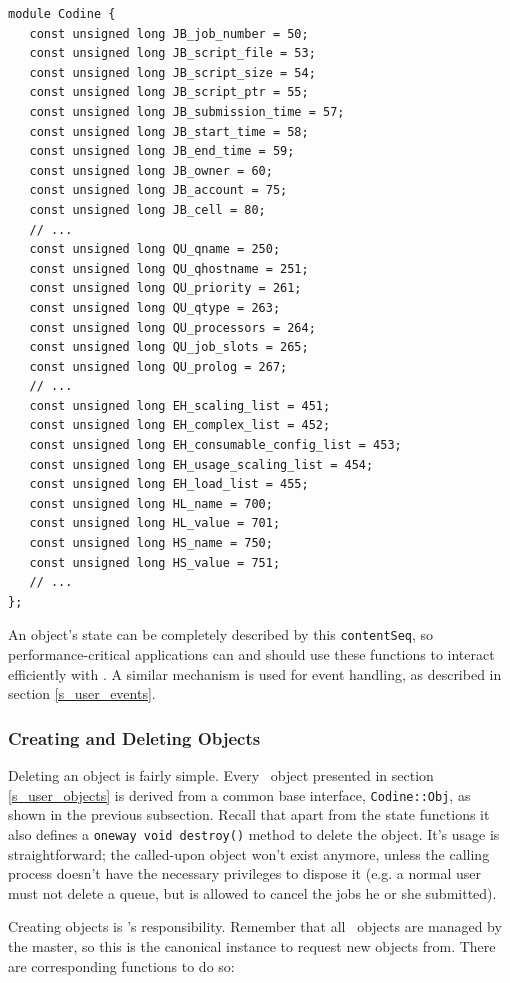 \begin{Verbatim}[fontsize=\small, frame=single]
module Codine {
   const unsigned long JB_job_number = 50;
   const unsigned long JB_script_file = 53;
   const unsigned long JB_script_size = 54;
   const unsigned long JB_script_ptr = 55;
   const unsigned long JB_submission_time = 57;
   const unsigned long JB_start_time = 58;
   const unsigned long JB_end_time = 59;
   const unsigned long JB_owner = 60;
   const unsigned long JB_account = 75;
   const unsigned long JB_cell = 80;
   // ...
   const unsigned long QU_qname = 250;
   const unsigned long QU_qhostname = 251;
   const unsigned long QU_priority = 261;
   const unsigned long QU_qtype = 263;
   const unsigned long QU_processors = 264;
   const unsigned long QU_job_slots = 265;
   const unsigned long QU_prolog = 267;
   // ...
   const unsigned long EH_scaling_list = 451;
   const unsigned long EH_complex_list = 452;
   const unsigned long EH_consumable_config_list = 453;
   const unsigned long EH_usage_scaling_list = 454;
   const unsigned long EH_load_list = 455;
   const unsigned long HL_name = 700;
   const unsigned long HL_value = 701;
   const unsigned long HS_name = 750;
   const unsigned long HS_value = 751;
   // ...
};

\end{Verbatim}

An object's state can be completely described by this \texttt{contentSeq}, so
per\-formance-critical applications can and should use these functions to 
interact efficiently with \codine. A similar mechanism is used for event
handling, as described in section \ref{s_user_events}.

\subsubsection{Creating and Deleting Objects}
Deleting an object is fairly simple. Every \codine\ object presented in section
\ref{s_user_objects} is derived from a common base interface,
\texttt{Codine::Obj}, as shown in the previous subsection. Recall that apart
from the state functions it also defines a \texttt{oneway void destroy()}
method to delete the object. It's usage is straightforward; the called-upon 
object won't exist anymore, unless the calling process doesn't have the
necessary privileges to dispose it (e.g. a normal user must not delete a
queue, but is allowed to cancel the jobs he or she submitted).

Creating objects is \master's responsibility. Remember that all \codine\
objects are managed by the master, so this is the canonical instance to request
new objects from. There are corresponding functions to do so:

